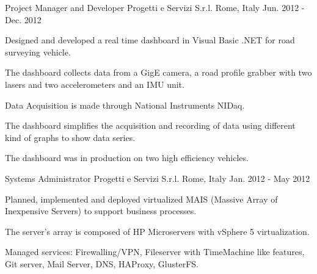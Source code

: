 \begin{cventries}
  \cventry
    {Project Manager and Developer} %
    {Progetti e Servizi S.r.l.} %
    {Rome, Italy} %
    {Jun. 2012 - Dec. 2012} %
    {
      \begin{cvitems} %
        \item {Designed and developed a real time dashboard in Visual Basic .NET for road surveying vehicle.}
        \item {The dashboard collects data from a GigE camera, a road profile grabber with two lasers and two accelerometers and an IMU unit.}
        \item {Data Acquisition is made through National Instruments NIDaq.}
        \item {The dashboard simplifies the acquisition and recording of data using different kind of graphs to show data series.}
        \item {The dashboard was in production on two high efficiency vehicles.}
      \end{cvitems}
    }

  \cventry
    {Systems Administrator} %
    {Progetti e Servizi S.r.l.} %
    {Rome, Italy} %
    {Jan. 2012 - May 2012} %
    {
      \begin{cvitems} %
        \item {Planned, implemented and deployed virtualized MAIS (Massive Array of Inexpensive Servers) to support business processes.}
        \item {The server's array is composed of HP Microservers with vSphere 5 virtualization.}
        \item {Managed services: Firewalling/VPN, Fileserver with TimeMachine like features, Git server, Mail Server, DNS, HAProxy, GlusterFS.}
      \end{cvitems}
    }


\end{cventries}
